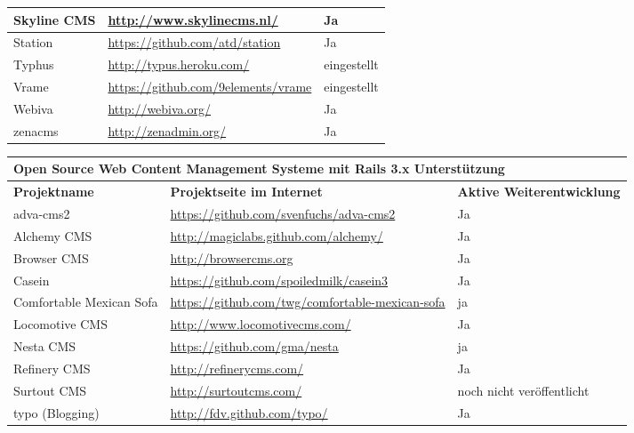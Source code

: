 \begin{table}[!ht]
\begin{tabular}[]{|p{3cm}|p{8cm}|p{4cm}|}
\hline
Skyline CMS & \href{http://www.skylinecms.nl/}{http://www.skylinecms.nl/} & Ja \\
\hline
Station & \href{https://github.com/atd/station}{https://github.com/atd/station} & Ja\\
\hline
Typhus & \href{http://typus.heroku.com/}{http://typus.heroku.com/} & eingestellt\\
\hline
Vrame & \href{https://github.com/9elements/vrame}{https://github.com/9elements/vrame} & eingestellt\\
\hline
Webiva & \href{http://webiva.org/}{http://webiva.org/} & Ja \\
\hline
zenacms & \href{http://zenadmin.org/}{http://zenadmin.org/} & Ja \\
\hline
\end{tabular}
\end{table}

\begin{table}
\center
\addtocounter{footnote}{1}
\begin{tabular}[]{|p{3cm}|p{8cm}|p{4cm}|}
\hline
\multicolumn{3}{|p{15cm}|}{\textbf{Open Source Web Content Management Systeme mit Rails 3.x Unterstützung}}\\
\hline
\textbf{Projektname}&\textbf{Projektseite im Internet}&\textbf{Aktive Weiterentwicklung}\\
\hline
adva-cms2 & \href{https://github.com/svenfuchs/adva-cms2}{https://github.com/svenfuchs/adva-cms2} & Ja \\
\hline
\cellcolor{alicegrey}Alchemy CMS & \cellcolor{alicegrey} \href{http://magiclabs.github.com/alchemy/}{http://magiclabs.github.com/alchemy/} &\cellcolor{alicegrey} Ja \\
\hline
\cellcolor{alicegrey}Browser CMS & \cellcolor{alicegrey} \href{http://browsercms.org}{http://browsercms.org} & \cellcolor{alicegrey} Ja \\
\hline
Casein & \href{https://github.com/spoiledmilk/casein3}{https://github.com/spoiledmilk/casein3} & Ja \\
\hline
Comfortable Mexican Sofa & \href{https://github.com/twg/comfortable-mexican-sofa}{https://github.com/twg/comfortable-mexican-sofa} & ja  \\
\hline
\cellcolor{alicegrey} Locomotive CMS & \cellcolor{alicegrey} \href{http://www.locomotivecms.com/}{http://www.locomotivecms.com/} & \cellcolor{alicegrey} Ja \\
\hline
Nesta CMS & \href{https://github.com/gma/nesta}{https://github.com/gma/nesta} & ja  \\
\hline
\cellcolor{alicegrey} Refinery CMS & \cellcolor{alicegrey} \href{http://refinerycms.com/}{http://refinerycms.com/} & \cellcolor{alicegrey} Ja \\
\hline
Surtout CMS & \href{http://surtoutcms.com/}{http://surtoutcms.com/} & noch nicht veröffentlicht \\
\hline
typo (Blogging) & \href{http://fdv.github.com/typo/}{http://fdv.github.com/typo/} & Ja \\
\hline
\end{tabular}
\end{table}

